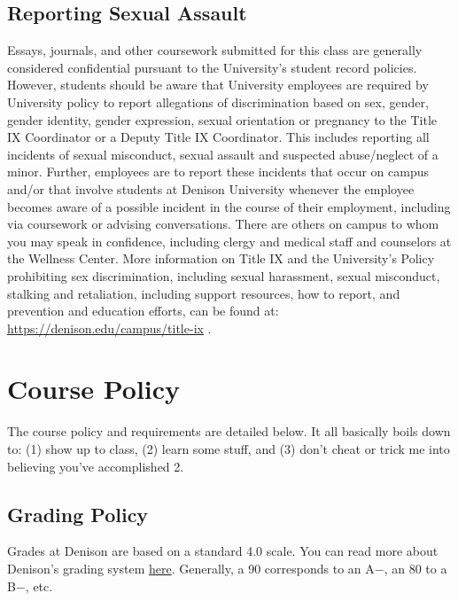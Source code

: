 \documentclass[11pt,]{article}
\begin{document}
\hypertarget{reporting-sexual-assault}{%
\subsection{Reporting Sexual Assault}\label{reporting-sexual-assault}}

Essays, journals, and other coursework submitted for this class are
generally considered confidential pursuant to the University's student
record policies. However, students should be aware that University
employees are required by University policy to report allegations of
discrimination based on sex, gender, gender identity, gender expression,
sexual orientation or pregnancy to the Title IX Coordinator or a Deputy
Title IX Coordinator. This includes reporting all incidents of sexual
misconduct, sexual assault and suspected abuse/neglect of a minor.
Further, employees are to report these incidents that occur on campus
and/or that involve students at Denison University whenever the employee
becomes aware of a possible incident in the course of their employment,
including via coursework or advising conversations. There are others on
campus to whom you may speak in confidence, including clergy and medical
staff and counselors at the Wellness Center. More information on Title
IX and the University's Policy prohibiting sex discrimination, including
sexual harassment, sexual misconduct, stalking and retaliation,
including support resources, how to report, and prevention and education
efforts, can be found at: \url{https://denison.edu/campus/title-ix} .

\hypertarget{course-policy}{%
\section{Course Policy}\label{course-policy}}

The course policy and requirements are detailed below. It all basically
boils down to: (1) show up to class, (2) learn some stuff, and (3) don't
cheat or trick me into believing you've accomplished 2.

\hypertarget{grading-policy}{%
\subsection{Grading Policy}\label{grading-policy}}

Grades at Denison are based on a standard 4.0 scale. You can read more
about Denison's grading system
\href{https://catalog.denison.edu/catalog/academic-program/grading-system-evaluation/}{here}.
Generally, a 90 corresponds to an A\(-\), an 80 to a B\(-\), etc.
\end{document}
